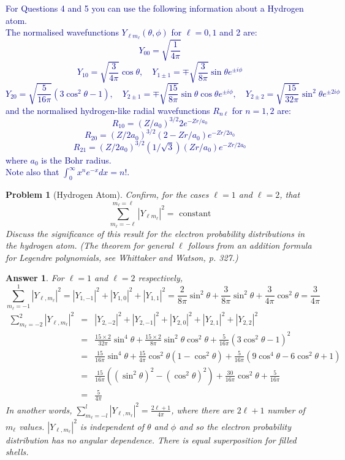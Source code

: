 \documentclass[a4paper]{article}
\newtheorem{ans}{Answer}[section]
\theoremstyle{new}
\newtheorem{qns}{Problem}[section]
\begin{document}
\newpage
\textcolor{darkblue}{For Questions 4 and 5 you can use the following information about a Hydrogen atom.\\[5pt]
The normalised wavefunctions $Y_{\ell m_\ell}(\theta,\phi)$ for $\ell=0,1$ and 2 are:
$$Y_{00}=\sqrt{\frac{1}{4\pi}}$$
$$Y_{10}=\sqrt{\frac{3}{4\pi}}\cos\theta,\quad Y_{1\pm1}=\mp\sqrt{\frac{3}{8\pi}}\sin\theta e^{\pm i\phi}$$
$$Y_{20}=\sqrt{\frac{5}{16\pi}}(3\cos^2\theta-1),\quad Y_{2\pm1}=\mp\sqrt{\frac{15}{8\pi}}\sin\theta\cos\theta e^{\pm i\phi},\quad Y_{2\pm2}=\sqrt{\frac{15}{32\pi}}\sin^2\theta e^{\pm 2i\phi}$$
and the normalised hydrogen-like radial wavefunctions $R_{n\ell}$ for $n = 1, 2$ are:
$$R_{10}=(Z/a_0)^{3/2}2e^{-Zr/a_0}$$
$$R_{20}=(Z/2a_0)^{3/2}(2-Zr/a_0)e^{-Zr/2a_0}$$
$$R_{21}=(Z/2a_0)^{3/2}(1/\sqrt{3})(Zr/a_0)e^{-Zr/2a_0}$$
where $a_0$ is the Bohr radius.\\[5pt]
Note also that $\int_0^\infty x^ne^{-x}dx=n!$.}
\begin{qns}[Hydrogen Atom]
Confirm, for the cases $\ell= 1$ and $\ell=2$, that
$$\sum_{m_\ell=-\ell}^{m_\ell=\ell}|Y_{\ell m_\ell}|^2=\text{ constant}$$
Discuss the significance of this result for the electron probability distributions in the hydrogen atom. (The theorem for general $\ell$ follows from an addition formula for Legendre polynomials, see Whittaker and Watson, p. 327.)
\end{qns}
\begin{ans}
For $\ell=1$ and $\ell=2$ respectively, 
$$\sum_{m_\ell=-1}^1|Y_{\ell,m_\ell}|^2=|Y_{1,-1}|^2+|Y_{1,0}|^2+|Y_{1,1}|^2=\frac{2}{8\pi}\sin^2\theta+\frac{3}{8\pi}\sin^2\theta+\frac{3}{4\pi}\cos^2\theta=\frac{3}{4\pi}$$
\begin{eqnarray}
\sum_{m_\ell=-2}^2|Y_{\ell,m_\ell}|^2&=&|Y_{2,-2}|^2+|Y_{2,-1}|^2+|Y_{2,0}|^2+|Y_{2,1}|^2+|Y_{2,2}|^2\nonumber\\&=&\frac{15\times 2}{32\pi}\sin^4\theta+\frac{15\times 2}{8\pi}\sin^2\theta\cos^2\theta+\frac{5}{16\pi}(3\cos^2\theta-1)^2\nonumber\\&=&\frac{15}{16\pi}\sin^4\theta+\frac{15}{4\pi}\cos^2\theta(1-\cos^2\theta)+\frac{5}{16\pi}(9\cos^4\theta-6\cos^2\theta+1)\nonumber\\&=&\frac{15}{16\pi}((\sin^2\theta)^2-(\cos^2\theta)^2)+\frac{30}{16\pi}\cos^2\theta+\frac{5}{16\pi}\nonumber\\&=&\frac{5}{4\pi}\nonumber
\end{eqnarray}
In another words, $\sum_{m_\ell=-l}^l|Y_{\ell,m_\ell}|^2=\frac{2\ell+1}{4\pi}$, where there are $2\ell+1$ number of $m_\ell$ values. $|Y_{\ell,m_\ell}|^2$ is independent of $\theta$ and $\phi$ and so the electron probability distribution has no angular dependence. There is equal superposition for filled shells.
\end{ans}
\end{document}
